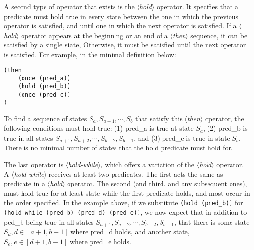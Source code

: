 \documentclass{article}
\newcommand{\dsl}[1]{{\it $\langle$#1$\rangle$}}
\begin{document}
A second type of operator that exists is the \dsl{hold} operator.
It specifies that a predicate must hold true in every state between the one in which the previous operator is satisfied, and until one in which the next operator is satisfied. 
If a \dsl{hold} operator appears at the beginning or an end of a \dsl{then} sequence, it can be satisfied by a single state, 
Otherwise, it must be satisfied until the next operator is satisfied. 
For example, in the minimal definition below: 
\begin{lstlisting}
(then
    (once (pred_a))
    (hold (pred_b)) 
    (once (pred_c))
)
\end{lstlisting}
To find a sequence of states $S_a, S_{a+1}, \cdots, S_b$ that satisfy this \dsl{then} operator, the following conditions must hold true: (1) pred_a is true at state $S_a$, (2) pred_b is true in all states $S_{a+1}, S_{a+2}, \cdots, S_{b-2}, S_{b-1}$, and (3) pred_c is true in state $S_b$.
There is no minimal number of states that the hold predicate must hold for. 

The last operator is \dsl{hold-while}, which offers a variation of the \dsl{hold} operator.
A \dsl{hold-while} receives at least two predicates. 
The first acts the same as predicate in a \dsl{hold} operator. 
The second (and third, and any subsequent ones), must hold true for at least state while the first predicate holds, and most occur in the order specified. 
In the example above, if we substitute \lstinline{(hold (pred_b))} for \lstinline{(hold-while (pred_b) (pred_d) (pred_e))}, we now expect that in addition to ped_b being true in all states $S_{a+1}, S_{a+2}, \cdots, S_{b-2}, S_{b-1}$, that there is some state $S_d, d \in [a+1, b-1]$ where pred_d holds, and another state, $S_e, e \in [d+1, b-1]$ where pred_e holds. 
        
\end{document}
